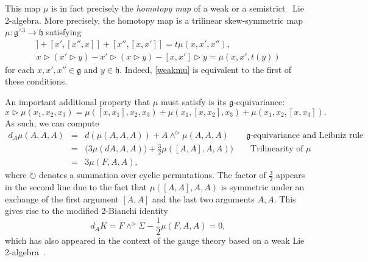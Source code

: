 \documentclass[onecolumn]{article}
\theoremstyle{theorem}
\theoremstyle{remark}
\theoremstyle{example}
\theoremstyle{definition}
\numberwithin{equation}{section}
\begin{document}

This map $\mu$ is in fact precisely the {\it {homotopy map}} %
of a { {weak}} \cite{Chen:2012gz,Kim:2019owc} or a { {semistrict}}~\cite{BaezRogers} Lie 2-algebra. More precisely, the homotopy map is a trilinear skew-symmetric map $\mu:\mathfrak{g}^{\wedge 3}\rightarrow\mathfrak{h}$ satisfying
\begin{eqnarray}
[x,[x',x'']]+[x',[x'',x]]+[x'',[x,x']]=t\mu(x,x',x''),\nonumber \\
x\rhd (x' \rhd y) - x' \rhd (x\rhd y) - [x,x']\rhd y = \mu(x,x',t(y))\label{homotopy}
\end{eqnarray}
for each $x,x',x''\in\mathfrak{g}$ and $y\in\mathfrak{h}$. Indeed,  \eqref{weakmu} is equivalent to the first of these conditions.


An important additional property that $\mu$ {must} satisfy is its $\mathfrak{g}$-equivariance:
\begin{equation}
    x\rhd \mu(x_1,x_2,x_3) = \mu([x,x_1],x_2,x_3) + \mu(x_1,[x,x_2],x_3) + \mu(x_1,x_2,[x,x_3]).\label{gequiv}
\end{equation}
{As} such, we can compute
\begin{eqnarray}
    d_A\mu(A,A,A) &=& d(\mu(A,A,A)) + A\wedge^\rhd \mu(A,A,A) \qquad\text{$\mathfrak{g}$-equivariance and Leibniz rule} \nonumber \\
    &=& \big(3\mu(dA,A,A)) + \frac{3}{2} \mu([A,A],A,A)\big) \qquad \text{Trilinearity of $\mu$} \nonumber \\
    &=& 3\mu(F,A,A),\nonumber
\end{eqnarray}
where $\circlearrowright$ denotes a summation over cyclic permutations.  The factor of $\frac{3}{2}$ appears in the {second} line due to the fact that $\mu([A,A],A,A)$ is symmetric under an exchange of the first argument $[A,A]$ and the last two arguments $A,A$.
This gives rise to the { {modified 2-Bianchi identity}}
\begin{equation}
d_AK = F\wedge^\rhd \Sigma - \frac{1}{2}\mu(F,A,A)=0,\nonumber
\end{equation}
which has also appeared in the context of the gauge theory based on a weak Lie 2-algebra~\cite{Kim:2019owc}.


\end{document}
